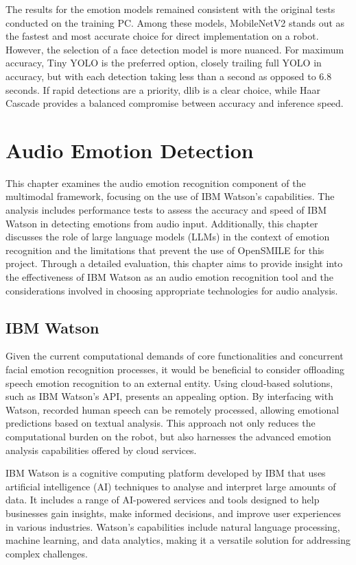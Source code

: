 The results for the emotion models remained consistent with the original tests conducted on the training PC. Among these models, MobileNetV2 stands out as the fastest and most accurate choice for direct implementation on a robot. However, the selection of a face detection model is more nuanced. For maximum accuracy, Tiny YOLO is the preferred option, closely trailing full YOLO in accuracy, but with each detection taking less than a second as opposed to 6.8 seconds. If rapid detections are a priority, dlib is a clear choice, while Haar Cascade provides a balanced compromise between accuracy and inference speed.

\chapter{Audio Emotion Detection}

This chapter examines the audio emotion recognition component of the multimodal framework, focusing on the use of IBM Watson's capabilities. The analysis includes performance tests to assess the accuracy and speed of IBM Watson in detecting emotions from audio input. Additionally, this chapter discusses the role of large language models (LLMs) in the context of emotion recognition and the limitations that prevent the use of OpenSMILE for this project. Through a detailed evaluation, this chapter aims to provide insight into the effectiveness of IBM Watson as an audio emotion recognition tool and the considerations involved in choosing appropriate technologies for audio analysis.

\section{IBM Watson}

Given the current computational demands of core functionalities and concurrent facial emotion recognition processes, it would be beneficial to consider offloading speech emotion recognition to an external entity. Using cloud-based solutions, such as IBM Watson's API, presents an appealing option. By interfacing with Watson, recorded human speech can be remotely processed, allowing emotional predictions based on textual analysis. This approach not only reduces the computational burden on the robot, but also harnesses the advanced emotion analysis capabilities offered by cloud services.

IBM Watson is a cognitive computing platform developed by IBM that uses artificial intelligence (AI) techniques to analyse and interpret large amounts of data. It includes a range of AI-powered services and tools designed to help businesses gain insights, make informed decisions, and improve user experiences in various industries. Watson's capabilities include natural language processing, machine learning, and data analytics, making it a versatile solution for addressing complex challenges.

